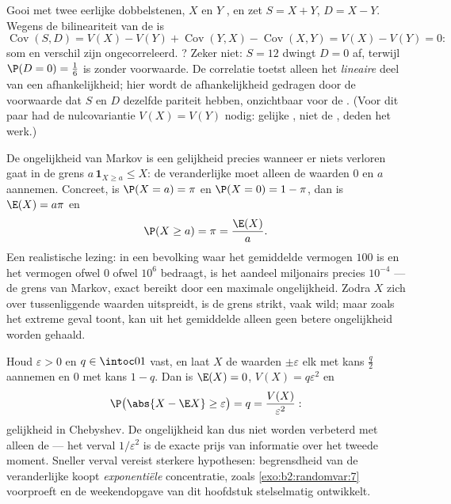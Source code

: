 \begin{example}\label{ex:b2:randomvar:sumdiff}
Gooi met twee eerlijke dobbelstenen, $X$ en $Y$ , en
zet $S = X + Y$, $D = X - Y$. Wegens de bilineariteit van de
 is
\[
\operatorname{Cov}(S, D) = V(X) - V(Y) +
\operatorname{Cov}(Y, X) - \operatorname{Cov}(X, Y) = V(X) -
V(Y) = 0 :
\]
som en verschil zijn ongecorreleerd. ? Zeker niet: $S
= 12$ dwingt $D = 0$ af, terwijl $\P(D = 0) = \frac16$ is zonder
voorwaarde. De correlatie toetst alleen het \emph{lineaire} deel
van een afhankelijkheid; hier wordt de afhankelijkheid gedragen
door de voorwaarde dat $S$ en $D$ dezelfde pariteit hebben,
onzichtbaar voor de . (Voor dit paar had de nulcovariantie
$V(X) = V(Y)$ nodig: gelijke , niet de
, deden het werk.)
\end{example}

\begin{example}\label{ex:b2:randomvar:markovsharp}
De ongelijkheid van Markov is een gelijkheid precies wanneer er
niets verloren gaat in de grens $a\,\mathbf 1_{X\geq a} \leq X$: de
veranderlijke moet alleen de waarden $0$ en $a$ aannemen. Concreet,
is $\P(X = a) = \pi$ en $\P(X = 0) = 1 - \pi$, dan is $\E(X) =
a\pi$ en
\[
\P(X \geq a) = \pi = \frac{\E(X)}{a} .
\]
Een realistische lezing: in een bevolking waar het gemiddelde
vermogen $100$ is en het vermogen ofwel $0$ ofwel $10^6$ bedraagt,
is het aandeel miljonairs precies $10^{-4}$ --- de grens van
Markov, exact bereikt door een maximale ongelijkheid. Zodra $X$
zich over tussenliggende waarden uitspreidt, is de grens strikt,
vaak wild; maar zoals het extreme geval toont, kan uit het
gemiddelde alleen geen betere ongelijkheid worden gehaald.
\end{example}

\begin{example}\label{ex:b2:randomvar:chebsharp}
Houd $\varepsilon > 0$ en $q \in \intoc01$ vast, en laat $X$ de
waarden $\pm\varepsilon$ elk met kans $\frac q2$ aannemen en $0$
met kans $1 - q$. Dan is $\E(X) = 0$, $V(X) = q\varepsilon^2$ en
\[
\P\bigl(\abs{X - \E X} \geq \varepsilon\bigr) = q
= \frac{V(X)}{\varepsilon^2} :
\]
gelijkheid in Chebyshev. De ongelijkheid kan dus niet worden
verbeterd met alleen de  --- het verval $1/\varepsilon^2$
is de exacte prijs van informatie over het tweede moment. Sneller
verval vereist sterkere hypothesen: begrensdheid van de
veranderlijke koopt \emph{exponentiële} concentratie, zoals
\cref{exo:b2:randomvar:7} voorproeft en de weekendopgave van dit
hoofdstuk stelselmatig ontwikkelt.
\end{example}


